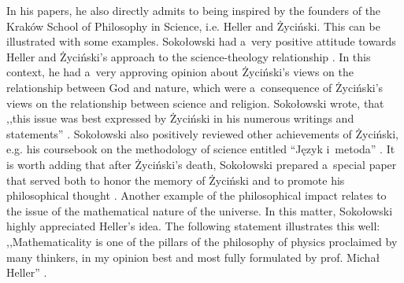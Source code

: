 \documentclass[%
  manuscript=article,
  year=2024,
  volume=77,
  doi=10.59203/zfn.77.689,
]{zfn}
\begin{document}
In his papers, he also directly admits to being inspired by the founders of the Kraków School of Philosophy in Science, i.e. Heller and Życiński. This can be illustrated with some examples. Sokołowski had a~very positive attitude towards Heller and Życiński's approach to the science-theology relationship 
\parencite[][]{Sokoowski1993Koscio}. %
 In this context, he had a~very approving opinion about Życiński's views on the relationship between God and nature, which were a~consequence of Życiński's views on the relationship between science and religion. Sokołowski wrote, that ,,this issue was best expressed by Życiński in his numerous writings and statements''
\parencite[][p.187]{Sokoowski2014Czy}. %
 Sokołowski also positively reviewed other achievements of Życiński, e.g. his coursebook on the methodology of science entitled ``Język i~metoda'' 
\parencite[][]{Sokoowski1983Jezyk}. %
 It is worth adding that after Życiński's death, Sokołowski prepared a~special paper that served both to honor the memory of Życiński and to promote his philosophical thought 
\parencite[][]{Sokoowski2015Granice}. %
 Another example of the philosophical impact relates to the issue of the mathematical nature of the universe. In this matter, Sokołowski highly appreciated Heller's idea. The following statement illustrates this well: ,,Mathematicality is one of the pillars of the philosophy of physics proclaimed by many thinkers, in my opinion best and most fully formulated by prof. Michał Heller''
\parencite[][p.47]{Sokoowski2011O}.%
\end{document}
